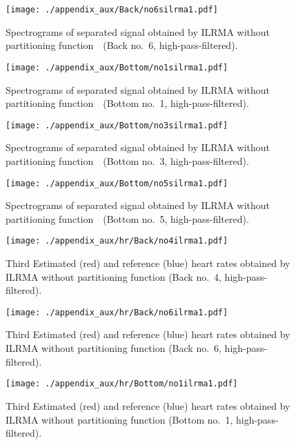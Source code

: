 \begin{figure}[tb]
\centering
\texttt{[image: ./appendix\_aux/Back/no6silrma1.pdf]}
\caption{Spectrograms of separated signal obtained by ILRMA without partitioning function　(Back no.~6, high-pass-filtered).}
\end{figure}

\begin{figure}[tb]
\centering
\texttt{[image: ./appendix\_aux/Bottom/no1silrma1.pdf]}
\caption{Spectrograms of separated signal obtained by ILRMA without partitioning function　(Bottom no.~1, high-pass-filtered).}
\end{figure}

\begin{figure}[tb]
\centering
\texttt{[image: ./appendix\_aux/Bottom/no3silrma1.pdf]}
\caption{Spectrograms of separated signal obtained by ILRMA without partitioning function　(Bottom no.~3, high-pass-filtered).}
\end{figure}

\begin{figure}[tb]
\centering
\texttt{[image: ./appendix\_aux/Bottom/no5silrma1.pdf]}
\caption{Spectrograms of separated signal obtained by ILRMA without partitioning function　(Bottom no.~5, high-pass-filtered).}
\end{figure}

\begin{figure}[tb]
\centering
\texttt{[image: ./appendix\_aux/hr/Back/no4ilrma1.pdf]}
\caption{Third Estimated (red) and reference (blue) heart rates obtained by ILRMA without partitioning function (Back no.~4, high-pass-filtered).}
\end{figure}

\begin{figure}[tb]
\centering
\texttt{[image: ./appendix\_aux/hr/Back/no6ilrma1.pdf]}
\caption{Third Estimated (red) and reference (blue) heart rates obtained by ILRMA without partitioning function (Back no.~6, high-pass-filtered).}
\end{figure}

\begin{figure}[tb]
\centering
\texttt{[image: ./appendix\_aux/hr/Bottom/no1ilrma1.pdf]}
\caption{Third Estimated (red) and reference (blue) heart rates obtained by ILRMA without partitioning function (Bottom no.~1, high-pass-filtered).}
\end{figure}

